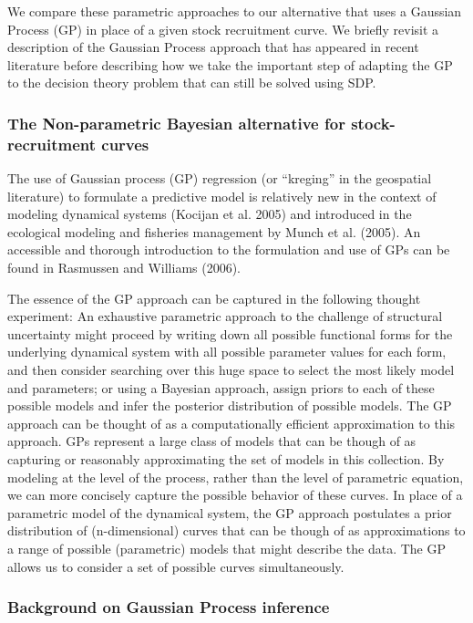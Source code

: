 \documentclass[author-year, review]{elsarticle} %
\begin{document}
We compare these parametric approaches to our alternative that uses a
Gaussian Process (GP) in place of a given stock recruitment curve. We
briefly revisit a description of the Gaussian Process approach that has
appeared in recent literature before describing how we take the
important step of adapting the GP to the decision theory problem that
can still be solved using SDP.

\subsubsection{The Non-parametric Bayesian alternative for
stock-recruitment curves}

The use of Gaussian process (GP) regression (or ``kreging'' in the
geospatial literature) to formulate a predictive model is relatively new
in the context of modeling dynamical systems (Kocijan et al. 2005) and
introduced in the ecological modeling and fisheries management by Munch
et al. (2005). An accessible and thorough introduction to the
formulation and use of GPs can be found in Rasmussen and Williams
(2006).

The essence of the GP approach can be captured in the following thought
experiment: An exhaustive parametric approach to the challenge of
structural uncertainty might proceed by writing down all possible
functional forms for the underlying dynamical system with all possible
parameter values for each form, and then consider searching over this
huge space to select the most likely model and parameters; or using a
Bayesian approach, assign priors to each of these possible models and
infer the posterior distribution of possible models. The GP approach can
be thought of as a computationally efficient approximation to this
approach. GPs represent a large class of models that can be though of as
capturing or reasonably approximating the set of models in this
collection. By modeling at the level of the process, rather than the
level of parametric equation, we can more concisely capture the possible
behavior of these curves. In place of a parametric model of the
dynamical system, the GP approach postulates a prior distribution of
(n-dimensional) curves that can be though of as approximations to a
range of possible (parametric) models that might describe the data. The
GP allows us to consider a set of possible curves simultaneously.

\subsubsection{Background on Gaussian Process inference}
\end{document}
